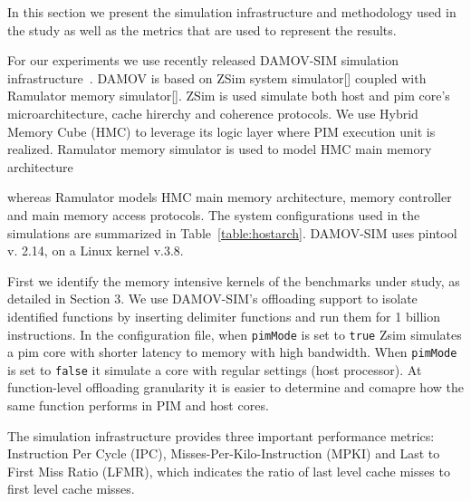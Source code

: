 

In this section we present the simulation infrastructure and methodology used in the study as well as the metrics that are used to represent the results.  

For our experiments we use recently released DAMOV-SIM simulation infrastructure~\cite{71}. DAMOV is based on ZSim system simulator[] coupled with Ramulator memory simulator[]. ZSim is used simulate both host and pim core's microarchitecture, cache hirerchy and coherence protocols. We use Hybrid Memory Cube (HMC) \fixme{[cite]} to leverage its logic layer where PIM execution unit is realized. Ramulator memory simulator is used to model HMC main memory architecture 



whereas Ramulator models HMC main memory architecture, memory controller and main memory access protocols. The system configurations used in the simulations are summarized in Table~\ref{table:hostarch}. DAMOV-SIM uses pintool v. 2.14, on a Linux kernel v.3.8.  

First we identify the memory intensive kernels of the benchmarks under study, as detailed in Section 3. We use DAMOV-SIM's offloading support to isolate identified functions by inserting delimiter functions and run them for 1 billion instructions. In the configuration file, when \texttt{pimMode} is set to \texttt{true} Zsim simulates a pim core with shorter latency to memory with high bandwidth. When \texttt{pimMode} is set to \texttt{false} it simulate a core with regular settings (host processor). At function-level offloading granularity it is easier to determine and comapre how the same function performs in PIM and host cores. %

The simulation infrastructure provides three important performance metrics: Instruction Per Cycle (IPC), Misses-Per-Kilo-Instruction (MPKI) and Last to First Miss Ratio (LFMR), which indicates the ratio of last level cache misses to first level cache misses.    










